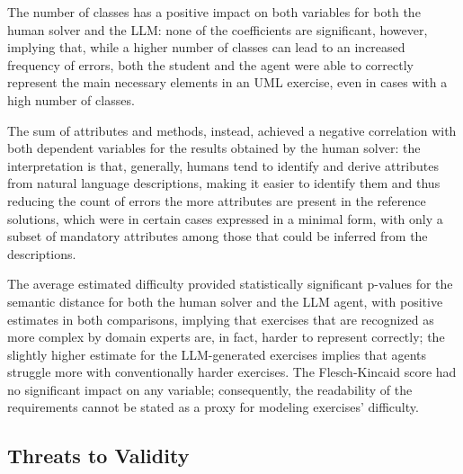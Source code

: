 The number of classes has a positive impact on both variables for both the human solver and the LLM: none of the coefficients are significant, however, implying that, while a higher number of classes can lead to an increased frequency of errors, both the student and the agent were able to correctly represent the main necessary elements in an UML exercise, even in cases with a high number of classes.

The sum of attributes and methods, instead, achieved a negative correlation with both dependent variables for the results obtained by the human solver: the interpretation is that, generally, humans tend to identify and derive attributes from natural language descriptions, making it easier to identify them and thus reducing the count of errors the more attributes are present in the reference solutions, which were in certain cases expressed in a minimal form, with only a subset of mandatory attributes among those that could be inferred from the descriptions.

The average estimated difficulty provided statistically significant p-values for the semantic distance for both the human solver and the LLM agent, with positive estimates in both comparisons, implying that exercises that are recognized as more complex by domain experts are, in fact, harder to represent correctly; the slightly higher estimate for the LLM-generated exercises implies that agents struggle more with conventionally harder exercises. The Flesch-Kincaid score had no significant impact on any variable; consequently, the readability of the requirements cannot be stated as a proxy for modeling exercises' difficulty.




\subsection{Threats to Validity}

